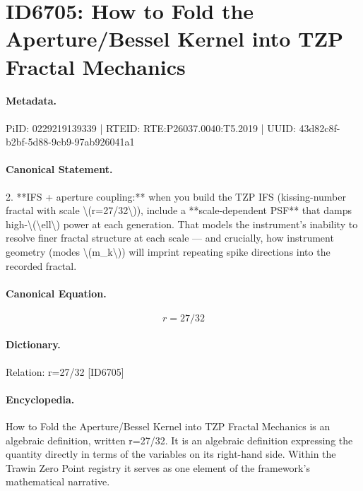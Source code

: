 \section*{ID6705: How to Fold the Aperture/Bessel Kernel into TZP Fractal Mechanics}
\paragraph{Metadata.}
PiID: 0229219139339 | RTEID: RTE:P26037.0040:T5.2019 | UUID: 43d82c8f-b2bf-5d88-9cb9-97ab926041a1

\paragraph{Canonical Statement.}
2. **IFS + aperture coupling:** when you build the TZP IFS (kissing-number fractal with scale \textbackslash{}(r=27/32\textbackslash{})), include a **scale-dependent PSF** that damps high-\textbackslash{}(\textbackslash{}ell\textbackslash{}) power at each generation. That models the instrument’s inability to resolve finer fractal structure at each scale — and crucially, how instrument geometry (modes \textbackslash{}(m\_k\textbackslash{})) will imprint repeating spike directions into the recorded fractal.

\paragraph{Canonical Equation.}
\[
r=27/32
\]

\paragraph{Dictionary.}
Relation: r=27/32 [ID6705]

\paragraph{Encyclopedia.}
How to Fold the Aperture/Bessel Kernel into TZP Fractal Mechanics is an algebraic definition, written r=27/32. It is an algebraic definition expressing the quantity directly in terms of the variables on its right-hand side. Within the Trawin Zero Point registry it serves as one element of the framework's mathematical narrative.
